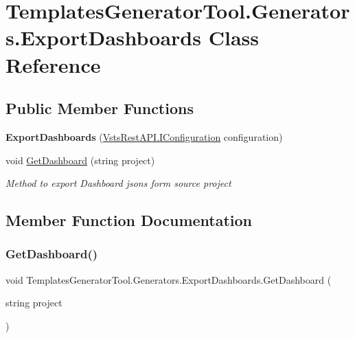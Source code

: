 \hypertarget{class_templates_generator_tool_1_1_generators_1_1_export_dashboards}{}\section{Templates\+Generator\+Tool.\+Generators.\+Export\+Dashboards Class Reference}
\label{class_templates_generator_tool_1_1_generators_1_1_export_dashboards}
\subsection*{Public Member Functions}
\begin{DoxyCompactItemize}
\item 
\mbox{\label{class_templates_generator_tool_1_1_generators_1_1_export_dashboards_a08fbf444146cbcac2c599781f39ee34a}} 
{\bfseries Export\+Dashboards} (\mbox{\hyperlink{interface_vsts_rest_a_p_i_1_1_i_configuration}{Vsts\+Rest\+A\+P\+I.\+I\+Configuration}} configuration)
\item 
void \mbox{\hyperlink{class_templates_generator_tool_1_1_generators_1_1_export_dashboards_a5f23b2dc5bd704add76697f8dfe5a530}{Get\+Dashboard}} (string project)
\begin{DoxyCompactList}\small\item\em Method to export Dashboard jsons form source project \end{DoxyCompactList}\end{DoxyCompactItemize}


\subsection{Member Function Documentation}
\mbox{\label{class_templates_generator_tool_1_1_generators_1_1_export_dashboards_a5f23b2dc5bd704add76697f8dfe5a530}} 
\subsubsection{\texorpdfstring{Get\+Dashboard()}{GetDashboard()}}
{\footnotesize\ttfamily void Templates\+Generator\+Tool.\+Generators.\+Export\+Dashboards.\+Get\+Dashboard (\begin{DoxyParamCaption}\item[{string}]{project }\end{DoxyParamCaption})}



